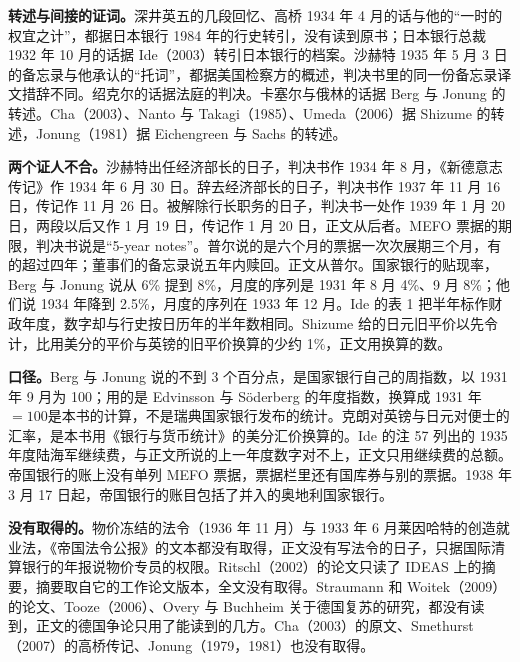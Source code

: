 \begin{deeper}[史料说明]
\textbf{转述与间接的证词。}深井英五的几段回忆、高桥 1934 年 4 月的话与他的“一时的权宜之计”，都据日本银行 1984 年的行史转引，没有读到原书；日本银行总裁 1932 年 10 月的话据 Ide（2003）转引日本银行的档案。沙赫特 1935 年 5 月 3 日的备忘录与他承认的“托词”，都据美国检察方的概述，判决书里的同一份备忘录译文措辞不同。绍克尔的话据法庭的判决。卡塞尔与俄林的话据 Berg 与 Jonung 的转述。Cha（2003）、Nanto 与 Takagi（1985）、Umeda（2006）据 Shizume 的转述，Jonung（1981）据 Eichengreen 与 Sachs 的转述。

\textbf{两个证人不合。}沙赫特出任经济部长的日子，判决书作 1934 年 8 月，《新德意志传记》作 1934 年 6 月 30 日。辞去经济部长的日子，判决书作 1937 年 11 月 16 日，传记作 11 月 26 日。被解除行长职务的日子，判决书一处作 1939 年 1 月 20 日，两段以后又作 1 月 19 日，传记作 1 月 20 日，正文从后者。MEFO 票据的期限，判决书说是“5-year notes”。普尔说的是六个月的票据一次次展期三个月，有的超过四年；董事们的备忘录说五年内赎回。正文从普尔。国家银行的贴现率，Berg 与 Jonung 说从 6\% 提到 8\%，月度的序列是 1931 年 8 月 4\%、9 月 8\%；他们说 1934 年降到 2.5\%，月度的序列在 1933 年 12 月。Ide 的表 1 把半年标作财政年度，数字却与行史按日历年的半年数相同。Shizume 给的日元旧平价以先令计，比用美分的平价与英镑的旧平价换算的少约 1\%，正文用换算的数。

\textbf{口径。}Berg 与 Jonung 说的不到 3 个百分点，是国家银行自己的周指数，以 1931 年 9 月为 100；用的是 Edvinsson 与 Söderberg 的年度指数，换算成 1931 年$=100$是本书的计算，不是瑞典国家银行发布的统计。克朗对英镑与日元对便士的汇率，是本书用《银行与货币统计》的美分汇价换算的。Ide 的注 57 列出的 1935 年度陆海军继续费，与正文所说的上一年度数字对不上，正文只用继续费的总额。帝国银行的账上没有单列 MEFO 票据，票据栏里还有国库券与别的票据。1938 年 3 月 17 日起，帝国银行的账目包括了并入的奥地利国家银行。

\textbf{没有取得的。}物价冻结的法令（1936 年 11 月）与 1933 年 6 月莱因哈特的创造就业法，《帝国法令公报》的文本都没有取得，正文没有写法令的日子，只据国际清算银行的年报说物价专员的权限。Ritschl（2002）的论文只读了 IDEAS 上的摘要，摘要取自它的工作论文版本，全文没有取得。Straumann 和 Woitek（2009）的论文、Tooze（2006）、Overy 与 Buchheim 关于德国复苏的研究，都没有读到，正文的德国争论只用了能读到的几方。Cha（2003）的原文、Smethurst（2007）的高桥传记、Jonung（1979，1981）也没有取得。


\end{deeper}
